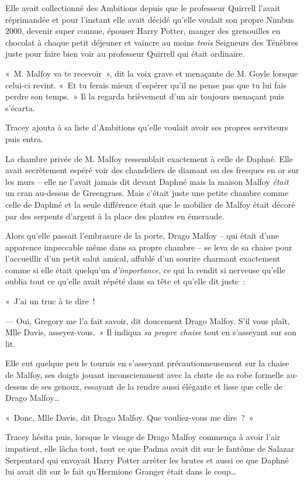 Elle avait collectionné des Ambitions depuis que le professeur Quirrell l'avait réprimandée et pour l'instant elle avait décidé qu'elle voulait son propre Nimbus 2000, devenir super connue, épouser Harry Potter, manger des grenouilles en chocolat à chaque petit déjeuner et vaincre au moins \emph{trois} Seigneurs des Ténèbres juste pour faire bien voir au professeur Quirrell qui était ordinaire.

«~M. Malfoy va te recevoir~», dit la voix grave et menaçante de M. Goyle lorsque celui-ci revint.
«~Et tu ferais mieux d'espérer qu'il ne pense pas que tu lui fais perdre son temps.~»
Il la regarda brièvement d'un air toujours menaçant puis s'écarta.

Tracey ajouta à sa liste d'Ambitions qu'elle voulait avoir ses propres serviteurs puis entra.

La chambre privée de M. Malfoy ressemblait exactement à celle de Daphné.
Elle avait secrètement espéré voir des chandeliers de diamant ou des fresques en or sur les murs -- elle ne l'avait jamais dit devant Daphné mais la maison Malfoy \emph{était} un cran au-dessus de Greengrass.
Mais c'était juste une petite chambre comme celle de Daphné et la seule différence était que le mobilier de Malfoy était décoré par des serpents d'argent à la place des plantes en émeraude.

Alors qu'elle passait l'embrasure de la porte, Drago Malfoy -- qui était d'une apparence impeccable même dans sa propre chambre -- se leva de sa chaise pour l'accueillir d'un petit salut amical, affublé d'un sourire charmant exactement comme si elle était quelqu'un \emph{d'importance}, ce qui la rendit si nerveuse qu'elle oublia tout ce qu'elle avait répété dans sa tête et qu'elle dit juste~:

«~J'ai un truc à te dire~!

--- Oui, Gregory me l'a fait savoir, dit doucement Drago Malfoy.
S'il vous plaît, Mlle Davis, asseyez-vous.~»
Il indiqua \emph{sa propre chaise} tout en s'asseyant sur son lit.

Elle eut quelque peu le tournis en s'asseyant précautionneusement sur la chaise de Malfoy, ses doigts jouant inconsciemment avec la chute de sa robe formelle au-dessus de ses genoux, essayant de la rendre aussi élégante et lisse que celle de Drago Malfoy…

«~Donc, Mlle Davis, dit Drago Malfoy.
Que vouliez-vous me dire~?~»

Tracey hésita puis, lorsque le visage de Drago Malfoy commença à avoir l'air impatient, elle lâcha tout, tout ce que Padma avait dit sur le fantôme de Salazar Serpentard qui envoyait Harry Potter arrêter les brutes et aussi ce que Daphné lui avait dit sur le fait qu'Hermione Granger était dans le coup…

